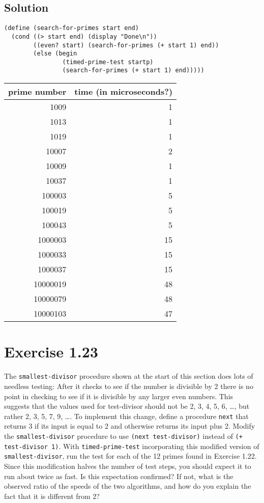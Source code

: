 \documentclass[11pt]{article}
\begin{document}
\subsection{Solution}
\label{sec:orgae83045}
\begin{verbatim}
(define (search-for-primes start end)
  (cond ((> start end) (display "Done\n"))
        ((even? start) (search-for-primes (+ start 1) end))
        (else (begin
                (timed-prime-test startp)
                (search-for-primes (+ start 1) end)))))
\end{verbatim}
\begin{center}
\begin{tabular}{rr}
prime number & time (in microseconds?)\\
\hline
1009 & 1\\
1013 & 1\\
1019 & 1\\
10007 & 2\\
10009 & 1\\
10037 & 1\\
100003 & 5\\
100019 & 5\\
100043 & 5\\
1000003 & 15\\
1000033 & 15\\
1000037 & 15\\
10000019 & 48\\
10000079 & 48\\
10000103 & 47\\
\end{tabular}
\end{center}
\section{Exercise 1.23}
\label{sec:org677a77d}
The \texttt{smallest-divisor} procedure shown at the start of this section does lots
of needless testing: After it checks to see if the number is divisible by 2
there is no point in checking to see if it is divisible by any larger even
numbers. This suggests that the values used for test-divisor should not be 2,
3, 4, 5, 6, \ldots{}, but rather 2, 3, 5, 7, 9, \ldots{}. To implement this change,
define a procedure \texttt{next} that returns 3 if its input is equal to 2 and
otherwise returns its input plus 2. Modify the \texttt{smallest-divisor} procedure to
use \texttt{(next test-divisor)} instead of \texttt{(+ test-divisor 1)}. With
\texttt{timed-prime-test} incorporating this modified version of \texttt{smallest-divisor},
run the test for each of the 12 primes found in Exercise 1.22. Since this
modification halves the number of test steps, you should expect it to run
about twice as fast. Is this expectation confirmed? If not, what is the
observed ratio of the speeds of the two algorithms, and how do you explain the
fact that it is different from 2?
\end{document}
